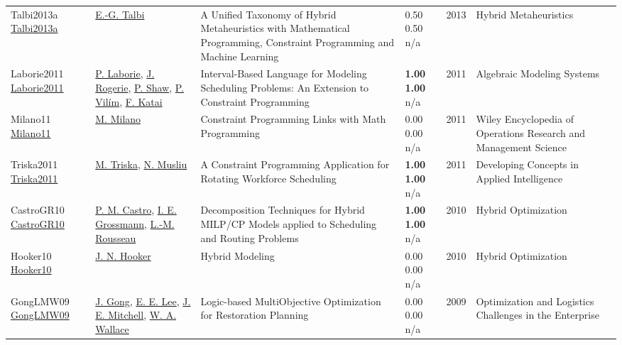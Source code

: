 {\begin{longtable}{p{3cm}p{5cm}p{10cm}p{1cm}rp{2.5cm}l}
Talbi2013a \href{http://dx.doi.org/10.1007/978-3-642-30671-6_1}{Talbi2013a} & \hyperref[auth:a1657]{E.-G. Talbi} & A Unified Taxonomy of Hybrid Metaheuristics with Mathematical Programming, Constraint Programming and Machine Learning & \noindent{}0.50 0.50 n/a & 2013 & Hybrid Metaheuristics & \cite{Talbi2013a}\\
Laborie2011 \href{http://dx.doi.org/10.1007/978-3-642-23592-4_6}{Laborie2011} & \hyperref[auth:a118]{P. Laborie}, \hyperref[auth:a1673]{J. Rogerie}, \hyperref[auth:a120]{P. Shaw}, \hyperref[auth:a1674]{P. Vilím}, \hyperref[auth:a1675]{F. Katai} & Interval-Based Language for Modeling Scheduling Problems: An Extension to Constraint Programming & \noindent{}\textbf{1.00} \textbf{1.00} n/a & 2011 & Algebraic Modeling Systems & \cite{Laborie2011}\\
Milano11 \href{http://dx.doi.org/10.1002/9780470400531.eorms0473}{Milano11} & \hyperref[auth:a143]{M. Milano} & Constraint Programming Links with Math Programming & \noindent{}\textcolor{black!50}{0.00} \textcolor{black!50}{0.00} n/a & 2011 & Wiley Encyclopedia of Operations Research and Management Science & \cite{Milano11}\\
Triska2011 \href{http://dx.doi.org/10.1007/978-3-642-21332-8_12}{Triska2011} & \hyperref[auth:a1843]{M. Triska}, \hyperref[auth:a45]{N. Musliu} & A Constraint Programming Application for Rotating Workforce Scheduling & \noindent{}\textbf{1.00} \textbf{1.00} n/a & 2011 & Developing Concepts in Applied Intelligence & \cite{Triska2011}\\
CastroGR10 \href{http://dx.doi.org/10.1007/978-1-4419-1644-0_4}{CastroGR10} & \hyperref[auth:a890]{P. M. Castro}, \hyperref[auth:a382]{I. E. Grossmann}, \hyperref[auth:a326]{L.-M. Rousseau} & Decomposition Techniques for Hybrid MILP/CP Models applied to Scheduling and Routing Problems & \noindent{}\textbf{1.00} \textbf{1.00} n/a & 2010 & Hybrid Optimization & \cite{CastroGR10}\\
Hooker10 \href{http://dx.doi.org/10.1007/978-1-4419-1644-0_2}{Hooker10} & \hyperref[auth:a160]{J. N. Hooker} & Hybrid Modeling & \noindent{}\textcolor{black!50}{0.00} \textcolor{black!50}{0.00} n/a & 2010 & Hybrid Optimization & \cite{Hooker10}\\
GongLMW09 \href{http://dx.doi.org/10.1007/978-0-387-88617-6_11}{GongLMW09} & \hyperref[auth:a1232]{J. Gong}, \hyperref[auth:a1233]{E. E. Lee}, \hyperref[auth:a1234]{J. E. Mitchell}, \hyperref[auth:a1235]{W. A. Wallace} & Logic-based MultiObjective Optimization for Restoration Planning & \noindent{}\textcolor{black!50}{0.00} \textcolor{black!50}{0.00} n/a & 2009 & Optimization and Logistics Challenges in the Enterprise & \cite{GongLMW09}\\

\end{longtable}}

